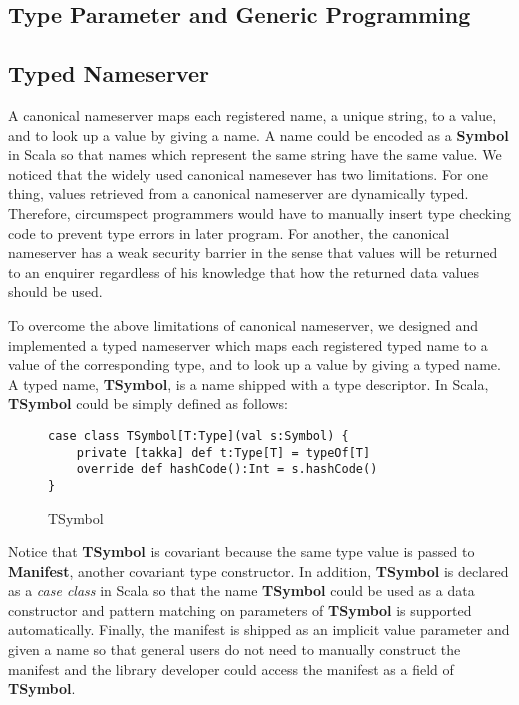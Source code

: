 \subsection{Type Parameter and Generic Programming}



\subsection{Typed Nameserver}
\label{nameserver}


A canonical nameserver maps each registered name, a unique string, to a value,
and to look up a value by giving a name.  A name could be encoded as a {\bf
Symbol} in Scala so that names which represent the same string have the same
value.  We noticed that the widely used canonical namesever has two limitations.
 For one thing, values retrieved from a canonical nameserver are dynamically
typed.  Therefore, circumspect programmers would have to manually insert type
checking code to prevent type errors in later program.  For another, the
canonical nameserver has a weak security barrier in the sense that values will
be returned to an enquirer regardless of his knowledge that how the returned
data values should be used.

To overcome the above limitations of canonical nameserver, we designed and
implemented a typed nameserver which maps each registered typed name to a value
of the corresponding type, and to look up a value by giving a typed name.  A
typed name, {\bf TSymbol}, is a name shipped with a type descriptor.  In Scala,
{\bf TSymbol} could be simply defined as follows:

\begin{figure}[h]
\label{tsymbol}
\begin{lstlisting}
case class TSymbol[T:Type](val s:Symbol) {
    private [takka] def t:Type[T] = typeOf[T]
    override def hashCode():Int = s.hashCode()  
}
\end{lstlisting}
\caption{TSymbol}
\end{figure}

Notice that {\bf TSymbol} is covariant because the same type value is passed to
{\bf Manifest}, another covariant type constructor.  In addition, {\bf TSymbol}
is declared as a {\it case class} in Scala so that the name {\bf TSymbol} could
be used as a data constructor and pattern matching on parameters of {\bf
TSymbol} is supported automatically.  Finally, the manifest is shipped as an
implicit value parameter and given a name so that general users do not need to
manually construct the manifest and the library developer could access the
manifest as a field of {\bf TSymbol}.


